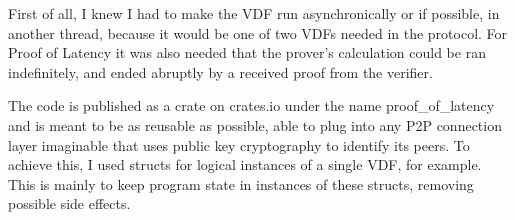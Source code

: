 First of all, I knew I had to make the VDF run asynchronically or if possible, in another thread, because it would be one of two VDFs needed in the protocol. For Proof of Latency it was also needed that the prover's calculation could be ran indefinitely, and ended abruptly by a received proof from the verifier.

The code is published as a crate on crates.io under the name proof\_of\_latency and is meant to be as reusable as possible, able to plug into any P2P connection layer imaginable that uses public key cryptography to identify its peers. To achieve this, I used structs for logical instances of a single VDF, for example. This is mainly to keep program state in instances of these structs, removing possible side effects.
